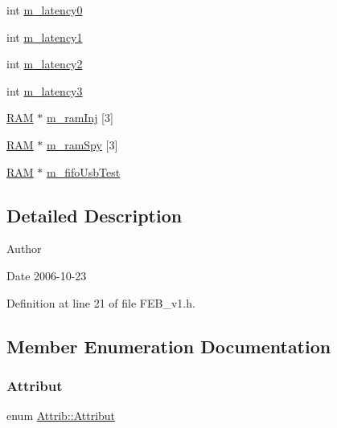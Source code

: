 \begin{DoxyCompactItemize}
int \hyperlink{classFEB__v1_a23a3d8bfbf96490890140f13b08a02c1}{m\+\_\+latency0}
\item 
int \hyperlink{classFEB__v1_a026d2f4973bf3ddbc404e35264fdef1f}{m\+\_\+latency1}
\item 
int \hyperlink{classFEB__v1_a2c4b18efd76de3bf7089bba57fb6744f}{m\+\_\+latency2}
\item 
int \hyperlink{classFEB__v1_a2f71bdcef05c845177a62610da490bf9}{m\+\_\+latency3}
\item 
\hyperlink{classRAM}{R\+AM} $\ast$ \hyperlink{classFEB__v1_a3a3d06225c94c88d4cc5da7a6bde3867}{m\+\_\+ram\+Inj} \mbox{[}3\mbox{]}
\item 
\hyperlink{classRAM}{R\+AM} $\ast$ \hyperlink{classFEB__v1_ae6d8176c12bd60ad25ed81d535eb8c82}{m\+\_\+ram\+Spy} \mbox{[}3\mbox{]}
\item 
\hyperlink{classRAM}{R\+AM} $\ast$ \hyperlink{classFEB__v1_a5850ce498462009212ad3f313fcf0bd6}{m\+\_\+fifo\+Usb\+Test}
\end{DoxyCompactItemize}


\subsection{Detailed Description}
\begin{DoxyAuthor}{Author}

\end{DoxyAuthor}
\begin{DoxyDate}{Date}
2006-\/10-\/23 
\end{DoxyDate}


Definition at line 21 of file F\+E\+B\+\_\+v1.\+h.



\subsection{Member Enumeration Documentation}
\mbox{\label{classAttrib_a69e171d7cc6417835a5a306d3c764235}} 
\subsubsection{\texorpdfstring{Attribut}{Attribut}}
{\footnotesize\ttfamily enum \hyperlink{classAttrib_a69e171d7cc6417835a5a306d3c764235}{Attrib\+::\+Attribut}\hspace{0.3cm}{\ttfamily [inherited]}}

